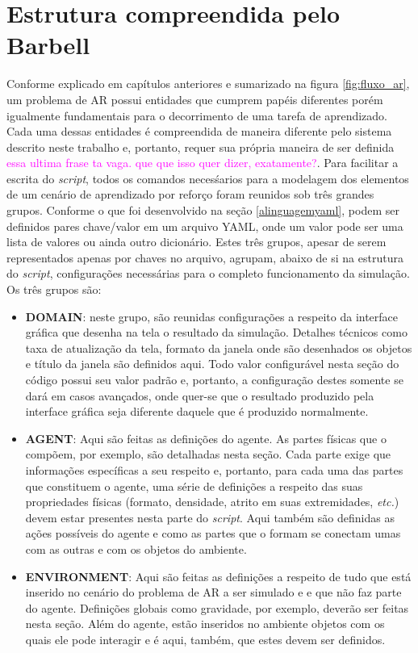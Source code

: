 \documentclass[cic,tc]{iiufrgs}
\newcommand\bruno[1]{\textcolor{magenta}{#1}}
\begin{document}
\section{Estrutura compreendida pelo Barbell}
Conforme explicado em capítulos anteriores e sumarizado na figura \ref{fig:fluxo_ar}, um problema de AR possui entidades que cumprem papéis diferentes porém
igualmente fundamentais para o decorrimento de uma tarefa de aprendizado. Cada uma dessas entidades é compreendida de maneira diferente pelo sistema descrito
neste trabalho e, portanto, requer sua própria maneira de ser definida \bruno{essa ultima frase ta vaga. que que isso quer dizer, exatamente?}. Para facilitar a escrita do \textit{script}, todos os comandos necesśarios para a modelagem
dos elementos de um cenário de aprendizado por reforço foram reunidos sob três grandes grupos. Conforme o que foi desenvolvido na seção \ref{alinguagemyaml},
podem ser definidos pares chave/valor em um arquivo YAML, onde um valor pode ser uma lista de valores ou ainda outro dicionário. Estes três grupos, apesar de serem
representados apenas por chaves no arquivo, agrupam, abaixo de si na estrutura do \textit{script}, configurações necessárias para o completo funcionamento da simulação.
Os três grupos são:
\begin{itemize}
  \item \par{\textbf{DOMAIN}: neste grupo, são reunidas configurações a respeito da interface gráfica que desenha na tela o resultado da simulação.
  Detalhes técnicos como taxa de atualização da tela, formato da janela onde são desenhados os objetos e título da janela são definidos aqui. Todo valor
  configurável nesta seção do código possui seu valor padrão e, portanto, a configuração destes somente se dará em casos avançados, onde quer-se que o
  resultado produzido pela interface gráfica seja diferente daquele que é produzido normalmente.}
  \item \par{\textbf{AGENT}: Aqui são feitas as definições do agente. As partes físicas que o compõem, por exemplo, são detalhadas nesta seção. Cada parte exige que
  informações específicas a seu respeito e, portanto, para cada uma das partes que constituem o agente, uma série de definições a respeito das suas propriedades
  físicas (formato, densidade, atrito em suas extremidades, \textit{etc.}) devem estar presentes nesta parte do \textit{script}. Aqui também são definidas as
  ações possíveis do agente e como as partes que o formam se conectam umas com as outras e com os objetos do ambiente.}
  \item \par{\textbf{ENVIRONMENT}: Aqui são feitas as definições a respeito de tudo que está inserido no cenário do problema de AR a ser simulado e e que não faz parte do agente. Definições globais como
  gravidade, por exemplo, deverão ser feitas nesta seção. Além do agente, estão inseridos no ambiente objetos com os quais ele pode interagir e é aqui, também, que estes devem
  ser definidos.}
\end{itemize}
\end{document}
